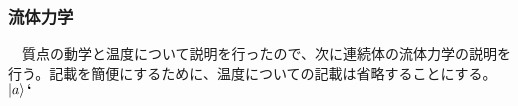 \subsubsection{流体力学}
　質点の動学と温度について説明を行ったので、次に連続体の流体力学の説明を行う。記載を簡便にするために、温度についての記載は省略することにする。$\ket{a}\bm`$